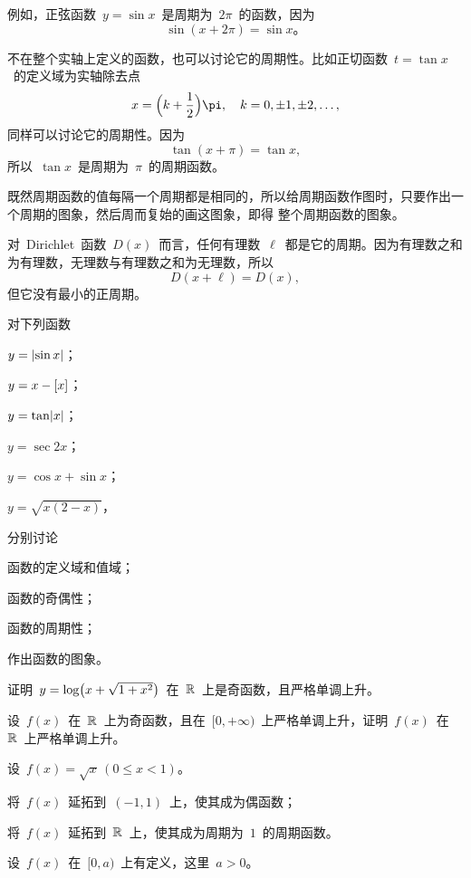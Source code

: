 例如，正弦函数~$y=\sin x$~是周期为~$2\pi$~的函数，因为
\[
  \sin(x+2\pi)=\sin x。
\]

不在整个实轴上定义的函数，也可以讨论它的周期性。比如正切函数~$t=\tan x$~的定义域为实轴除去点
\[
  x=\Paren[\Big]{k+\frac12}\pi,\quad k=0,\pm1,\pm2,\dotsc,
\]
同样可以讨论它的周期性。因为
\[
  \tan(x+\pi)=\tan x,
\]
所以~$\tan x$~是周期为~$\pi$~的周期函数。

既然周期函数的值每隔一个周期都是相同的，所以给周期函数作图时，只要作出一个周期的图象，然后周而复始的画这图象，即得
整个周期函数的图象。

对~Dirichlet~函数~$D(x)$~而言，任何有理数~$\ell$~都是它的周期。因为有理数之和为有理数，无理数与有理数之和为无理数，所以
\[
  D(x+\ell)=D(x),
\]
但它没有最小的正周期。

\begin{exercise}
\item 对下列函数
\begin{exlistcols}[3]
  \item $y=\lvert\sin x\rvert$；
  \item $y=x-\lbrack x\rbrack$；
  \item $y=\tan\lvert x\rvert$；
  \item $y=\sec 2x$；
  \item $y=\cos x+\sin x$；
  \item $y=\sqrt{x(2-x)}$，
\end{exlistcols}
分别讨论
\begin{exlistcols}
  \item 函数的定义域和值域；
  \item 函数的奇偶性；
  \item 函数的周期性；
  \item 作出函数的图象。
\end{exlistcols}
\item 证明~$y=\log\bigl\lparen x+\sqrt{1+x^2}\bigr\rparen$~在~$\mathbb{R}$~上是奇函数，且严格单调上升。
\item 设~$f(x)$~在~$\mathbb{R}$~上为奇函数，且在~$[0,+\infty)$~上严格单调上升，证明~$f(x)$~在~$\mathbb{R}$~上严格单调上升。
\item 设~$f(x)=\sqrt x\,(0\leq x<1)$。
\begin{exlist}
  \item 将~$f(x)$~延拓到~$(-1,1)$~上，使其成为偶函数；
  \item 将~$f(x)$~延拓到~$\mathbb{R}$~上，使其成为周期为~$1$~的周期函数。
\end{exlist}
\item 设~$f(x)$~在~$[0,a)$~上有定义，这里~$a>0$。
\begin{exlist}

\end{exlist}
\end{exercise}
